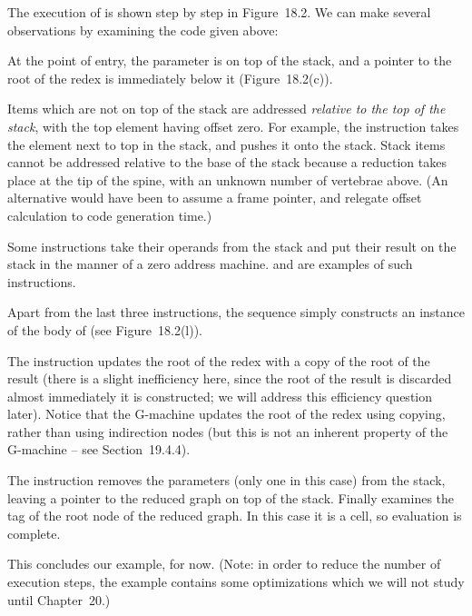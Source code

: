 The execution of  is shown step by step in Figure~18.2. We can make
several observations by examining the code given above:

\begin{numbered}
    \item At the point of entry, the parameter  is on top of the stack, and a pointer
    to the root of the redex is immediately below it (Figure~18.2(c)).
    \item Items which are not on top of the stack are addressed \textit{relative to the top of
        the stack}, with the top element having offset zero. For example, the
     instruction takes the element next to top in the stack, and pushes
    it onto the stack. Stack items cannot be addressed relative to the base of
    the stack because a reduction takes place at the tip of the spine, with an
    unknown number of vertebrae above. (An alternative would have been
    to assume a frame pointer, and relegate offset calculation to code
    generation time.)
    \item Some instructions take their operands from the stack and put their result
    on the stack in the manner of a zero address machine.  and 
    are examples of such instructions.
\end{numbered}

\noindent
Apart from the last three instructions, the sequence simply constructs an
instance of the body of  (see Figure~18.2(l)).

The  instruction updates the root of the redex with a copy of the
root of the result (there is a slight inefficiency here, since the root of the result
is discarded almost immediately it is constructed; we will address this
efficiency question later). Notice that the G-machine updates the root of the
redex using copying, rather than using indirection nodes (but this is not an
inherent property of the G-machine -- see Section~19.4.4).

The  instruction removes the parameters (only one in this case) from
the stack, leaving a pointer to the reduced graph on top of the stack. Finally
 examines the tag of the root node of the reduced graph. In this case it
is a  cell, so evaluation is complete.

This concludes our example, for now. (Note: in order to reduce the number
of execution steps, the example contains some optimizations which we will
not study until Chapter~20.)

